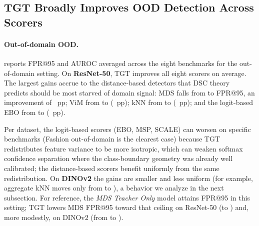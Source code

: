 \subsection{TGT Broadly Improves OOD Detection Across Scorers}

\paragraph{Out-of-domain OOD.}
 reports FPR@95 and AUROC averaged across the eight benchmarks for the out-of-domain setting. On \textbf{ResNet-50}, TGT improves all eight scorers on average. The largest gains accrue to the distance-based detectors that DSC theory predicts should be most starved of domain signal: MDS falls from  to  FPR@95, an improvement of ~pp; ViM from  to  (~pp); kNN from  to  (~pp); and the logit-based EBO from  to  (~pp).

Per dataset, the logit-based scorers (EBO, MSP, SCALE) can worsen on specific benchmarks (Fashion out-of-domain is the clearest case) because TGT redistributes feature variance to be more isotropic, which can weaken softmax confidence separation where the class-boundary geometry was already well calibrated; the distance-based scorers benefit uniformly from the same redistribution. On \textbf{DINOv2} the gains are smaller and less uniform (for example, aggregate kNN moves only from  to ), a behavior we analyze in the next subsection. For reference, the \emph{MDS Teacher Only} model attains  FPR@95 in this setting; TGT lowers MDS FPR@95 toward that ceiling on ResNet-50 (to ) and, more modestly, on DINOv2 (from  to ).

